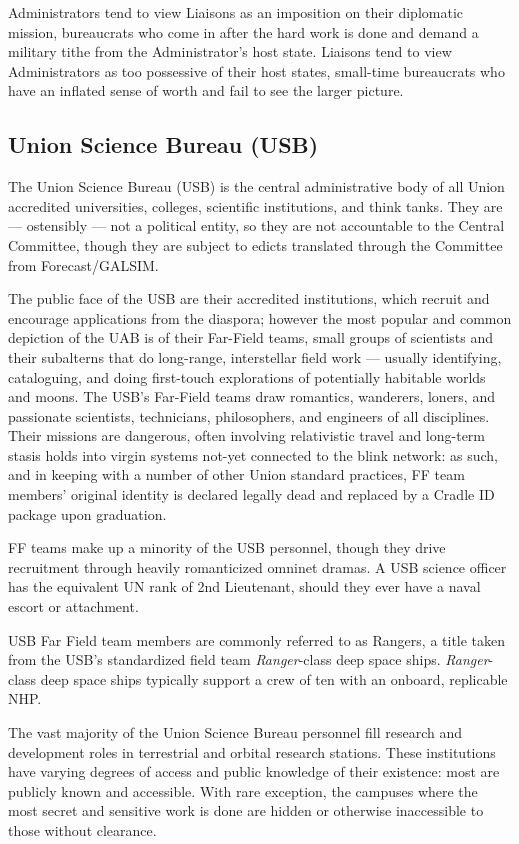 Administrators tend to view Liaisons as an imposition on their diplomatic mission, bureaucrats
who come in after the hard work is done and demand a military tithe from the Administrator's
host state. Liaisons tend to view Administrators as too possessive of their host states, small-time
bureaucrats who have an inflated sense of worth and fail to see the larger picture.

\subsection{Union Science Bureau (USB)}

The Union Science Bureau (USB) is the central administrative body of all Union accredited
universities, colleges, scientific institutions, and think tanks. They are — ostensibly — not a
political entity, so they are not accountable to the Central Committee, though they are subject to
edicts translated through the Committee from Forecast/GALSIM.

The public face of the USB are their accredited institutions, which recruit and encourage
applications from the diaspora; however the most popular and common depiction of the UAB is
of their Far-Field teams, small groups of scientists and their subalterns that do long-range,
interstellar field work — usually identifying, cataloguing, and doing first-touch explorations of
potentially habitable worlds and moons. The USB's Far-Field teams draw romantics, wanderers,
loners, and passionate scientists, technicians, philosophers, and engineers of all disciplines.
Their missions are dangerous, often involving relativistic travel and long-term stasis holds into
virgin systems not-yet connected to the blink network: as such, and in keeping with a number of
other Union standard practices, FF team members' original identity is declared legally dead and
replaced by a Cradle ID package upon graduation.

FF teams make up a minority of the USB personnel, though they drive recruitment through
heavily romanticized omninet dramas. A USB science officer has the equivalent UN rank of 2nd
Lieutenant, should they ever have a naval escort or attachment.

USB Far Field team members are commonly referred to as Rangers, a title taken from the USB's
standardized field team \textit{Ranger}-class deep space ships. \textit{Ranger}-class deep space ships typically
support a crew of ten with an onboard, replicable NHP.

The vast majority of the Union Science Bureau personnel fill research and development roles in
terrestrial and orbital research stations. These institutions have varying degrees of access and
public knowledge of their existence: most are publicly known and accessible. With rare
exception, the campuses where the most secret and sensitive work is done are hidden or
otherwise inaccessible to those without clearance.

